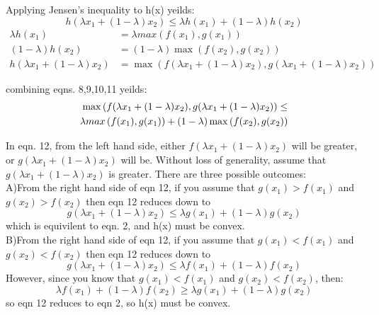 \documentclass[12pt]{article}
\begin{document}
Applying Jensen's inequality to h(x) yeilds: 
\begin{equation}
h(\lambda x_1  + (1 − \lambda) x_2 ) \leq \lambda h(x_1)+(1-\lambda)h(x_2)
\end{equation}
\begin{align}
    \lambda h(x_1) &= \lambda max\left(f(x_1),g(x_1)\right) \\
    (1-\lambda) h(x_2) &= (1-\lambda) \max \left(f(x_2),g(x_2)\right) \\
    h(\lambda x_1  +(1−\lambda)x_2) &= \max \left( f(\lambda x_1  +(1-\lambda)x_2),g(\lambda x_1  +(1-\lambda)x_2)\right)    
\end{align}

combining eqns. 8,9,10,11 yeilds: 
\begin{align}
\max \left( f(\lambda x_1  +(1-\lambda)x_2),g(\lambda x_1  +(1-\lambda)x_2)\right) \leq \\
\lambda max\left(f(x_1),g(x_1)\right) + (1-\lambda) \max \left(f(x_2),g(x_2)\right) \notag
\end{align}

In eqn. 12, from the left hand side, either $f(\lambda x_1  +(1-\lambda)x_2)$ will be greater, or 
$g(\lambda x_1  +(1-\lambda)x_2)$ will be. Without loss of generality, assume that 
$g(\lambda x_1  +(1-\lambda)x_2)$ is greater. There are three possible outcomes: \\

A)From the right hand side of eqn 12, if you assume that $g(x_1) > f(x_1)$ and $g(x_2) > f(x_2)$ 
then eqn 12 reduces down to 
\begin{equation*}
g(\lambda x_1  +(1-\lambda)x_2 ) \leq \lambda g(x_1)+(1-\lambda)g(x_2)
\end{equation*}
which is equivilent to eqn. 2, and h(x) must be convex. \\

B)From the right hand side of eqn 12, if you assume that $g(x_1) < f(x_1)$ and $g(x_2) < f(x_2)$ 
then eqn 12 reduces down to
\begin{equation*}
g(\lambda x_1  +(1-\lambda)x_2 ) \leq \lambda f(x_1)+(1-\lambda)f(x_2)
\end{equation*}
However, since you know that $g(x_1) < f(x_1)$ and $g(x_2) < f(x_2)$, then: 
\begin{equation*}
\lambda f(x_1)+(1-\lambda)f(x_2) \geq \lambda g(x_1)+(1-\lambda)g(x_2)
\end{equation*}
so eqn 12 reduces to eqn 2, so h(x) must be convex. \\
\end{document}
